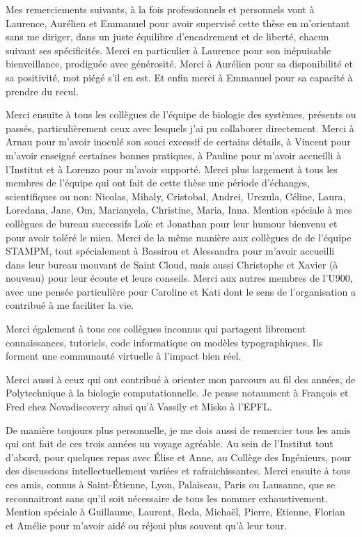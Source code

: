 \documentclass[a4paper,12pt,twoside,onecolumn,openright,final,oldfontcommands]{memoir}
\begin{document}
Mes remerciements suivants, à la fois professionnels et personnels vont
à Laurence, Aurélien et Emmanuel pour avoir supervisé cette thèse en
m'orientant sans me diriger, dans un juste équilibre d'encadrement et de
liberté, chacun suivant ses spécificités. Merci en particulier à
Laurence pour son inépuisable bienveillance, prodiguée avec générosité.
Merci à Aurélien pour sa disponibilité et sa positivité, mot piégé s'il
en est. Et enfin merci à Emmanuel pour sa capacité à prendre du recul.

Merci ensuite à tous les collègues de l'équipe de biologie des systèmes,
présents ou passés, particulièrement ceux avec lesquels j'ai pu
collaborer directement. Merci à Arnau pour m'avoir inoculé son souci
excessif de certains détails, à Vincent pour m'avoir enseigné certaines
bonnes pratiques, à Pauline pour m'avoir accueilli à l'Institut et à
Lorenzo pour m'avoir supporté. Merci plus largement à tous les membres
de l'équipe qui ont fait de cette thèse une période d'échanges,
scientifiques ou non: Nicolas, Mihaly, Cristobal, Andrei, Urczula,
Céline, Laura, Loredana, Jane, Om, Marianyela, Christine, Maria, Inna.
Mention spéciale à mes collègues de bureau successifs Loïc et Jonathan
pour leur humour bienvenu et pour avoir toléré le mien. Merci de la même
manière aux collègues de de l'équipe STAMPM, tout spécialement à
Bassirou et Alessandra pour m'avoir accueilli dans leur bureau mouvant
de Saint Cloud, mais aussi Christophe et Xavier (à nouveau) pour leur
écoute et leurs conseils. Merci aux autres membres de l'U900, avec une
pensée particulière pour Caroline et Kati dont le sens de l'organisation
a contribué à me faciliter la vie.

Merci également à tous ces collègues inconnus qui partagent librement
connaissances, tutoriels, code informatique ou modèles typographiques.
Ils forment une communauté virtuelle à l'impact bien réel.

Merci aussi à ceux qui ont contribué à orienter mon parcours au fil des
années, de Polytechnique à la biologie computationnelle. Je pense
notamment à François et Fred chez Novadiscovery ainsi qu'à Vassily et
Misko à l'EPFL.

De manière toujours plus personnelle, je me dois aussi de remercier tous
les amis qui ont fait de ces trois années un voyage agréable. Au sein de
l'Institut tout d'abord, pour quelques repas avec Élise et Anne, au
Collège des Ingénieurs, pour des discussions intellectuellement variées
et rafraichissantes. Merci ensuite à tous ces amis, connus à
Saint-Étienne, Lyon, Palaiseau, Paris ou Lausanne, que se reconnaitront
sans qu'il soit nécessaire de tous les nommer exhaustivement. Mention
spéciale à Guillaume, Laurent, Reda, Michaël, Pierre, Etienne, Florian
et Amélie pour m'avoir aidé ou réjoui plus souvent qu'à leur tour.
\end{document}
